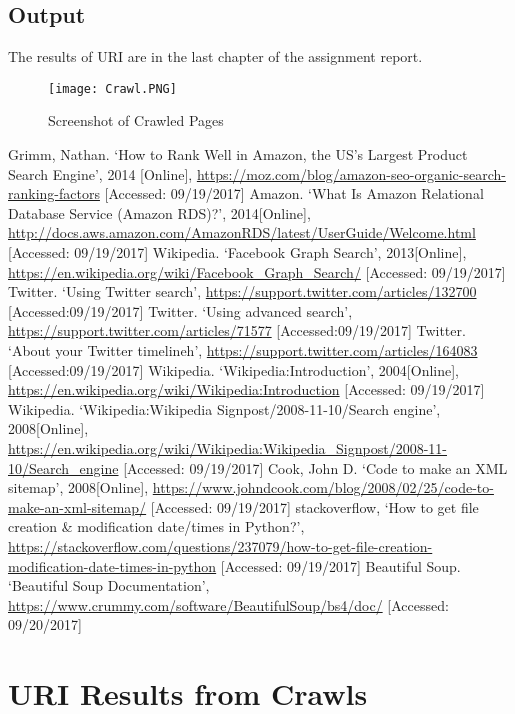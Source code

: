\documentclass[12pt]{report}
\begin{document}
\section{Output}
The results of URI are in the last chapter of the assignment report.
\begin{figure}[ht]

  \centering
  \texttt{[image: Crawl.PNG]}
  \caption{Screenshot of Crawled Pages}
  \label{fig:11}
\end{figure}

\begin{thebibliography}{9}
 Grimm, Nathan. `How to Rank Well in Amazon, the US's Largest Product Search Engine', 2014 [Online], \url{ https://moz.com/blog/amazon-seo-organic-search-ranking-factors} [Accessed: 09/19/2017] 
Amazon. `What Is Amazon Relational Database Service (Amazon RDS)?', 2014[Online],\url{ http://docs.aws.amazon.com/AmazonRDS/latest/UserGuide/Welcome.html} [Accessed: 09/19/2017]
Wikipedia. `Facebook Graph Search', 2013[Online], \url{https://en.wikipedia.org/wiki/Facebook_Graph_Search/} [Accessed: 09/19/2017]
Twitter. `Using Twitter search', \url{https://support.twitter.com/articles/132700} [Accessed:09/19/2017] 
Twitter. `Using advanced search', \url{https://support.twitter.com/articles/71577} [Accessed:09/19/2017] 
Twitter. `About your Twitter timelineh', \url{https://support.twitter.com/articles/164083} [Accessed:09/19/2017] 
Wikipedia. `Wikipedia:Introduction', 2004[Online], \url{https://en.wikipedia.org/wiki/Wikipedia:Introduction} [Accessed: 09/19/2017]
Wikipedia. `Wikipedia:Wikipedia Signpost/2008-11-10/Search engine', 2008[Online], \url{https://en.wikipedia.org/wiki/Wikipedia:Wikipedia_Signpost/2008-11-10/Search_engine} [Accessed: 09/19/2017]
Cook, John D.  `Code to make an XML sitemap', 2008[Online], \url{https://www.johndcook.com/blog/2008/02/25/code-to-make-an-xml-sitemap/} [Accessed: 09/19/2017]
stackoverflow, `How to get file creation \& modification date/times in Python?', \url{https://stackoverflow.com/questions/237079/how-to-get-file-creation-modification-date-times-in-python} [Accessed: 09/19/2017]
Beautiful Soup. `Beautiful Soup Documentation', \url{ https://www.crummy.com/software/BeautifulSoup/bs4/doc/} [Accessed: 09/20/2017]
\end{thebibliography}

\chapter{URI Results from Crawls}
 
\end{document}
